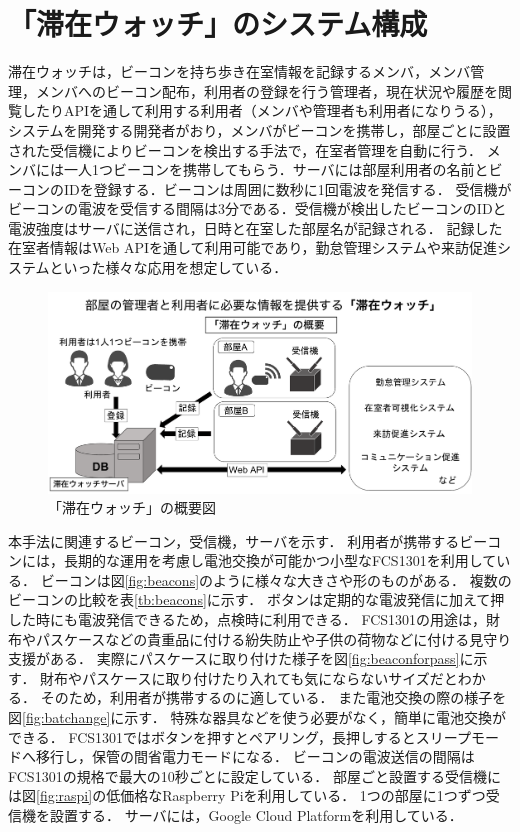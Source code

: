 

\section{「滞在ウォッチ」のシステム構成}\label{3.1}
滞在ウォッチは，ビーコンを持ち歩き在室情報を記録するメンバ，メンバ管理，メンバへのビーコン配布，利用者の登録を行う管理者，現在状況や履歴を閲覧したりAPIを通して利用する利用者（メンバや管理者も利用者になりうる），システムを開発する開発者がおり，メンバがビーコンを携帯し，部屋ごとに設置された受信機によりビーコンを検出する手法で，在室者管理を自動に行う．
メンバには一人1つビーコンを携帯してもらう．サーバには部屋利用者の名前とビーコンのIDを登録する．ビーコンは周囲に数秒に1回電波を発信する．
受信機がビーコンの電波を受信する間隔は3分である．受信機が検出したビーコンのIDと電波強度はサーバに送信され，日時と在室した部屋名が記録される．
記録した在室者情報はWeb APIを通して利用可能であり，勤怠管理システムや来訪促進システムといった様々な応用を想定している．

\begin{figure}[h]
  \centering  %
  \includegraphics[clip,scale = 0.45]{image/platform-idea.pdf}
  \caption{「滞在ウォッチ」の概要図}    \label{StayWatchOverview}
\end{figure}

本手法に関連するビーコン，受信機，サーバを示す．
利用者が携帯するビーコンには，長期的な運用を考慮し電池交換が可能かつ小型なFCS1301\cite{fcs1301}を利用している．
ビーコンは図\ref{fig:beacons}のように様々な大きさや形のものがある．
複数のビーコンの比較を表\ref{tb:beacons}に示す．
ボタンは定期的な電波発信に加えて押した時にも電波発信できるため，点検時に利用できる．
FCS1301の用途は，財布やパスケースなどの貴重品に付ける紛失防止や子供の荷物などに付ける見守り支援がある．
実際にパスケースに取り付けた様子を図\ref{fig:beaconforpass}に示す．
財布やパスケースに取り付けたり入れても気にならないサイズだとわかる．
そのため，利用者が携帯するのに適している．
また電池交換の際の様子を図\ref{fig:batchange}に示す．
特殊な器具などを使う必要がなく，簡単に電池交換ができる．
FCS1301ではボタンを押すとペアリング，長押しするとスリープモードへ移行し，保管の間省電力モードになる．
ビーコンの電波送信の間隔はFCS1301の規格で最大の10秒ごとに設定している．
部屋ごと設置する受信機には図\ref{fig:raspi}の低価格なRaspberry Pi\cite{raspi}を利用している．
1つの部屋に1つずつ受信機を設置する．
サーバには，Google Cloud Platform\cite{platform}を利用している．

